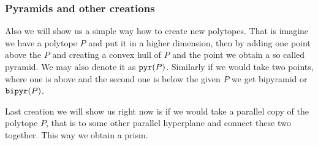 \subsubsection{Pyramids and other creations}

Also we will show us a simple way how to create new polytopes. That is imagine we have a polytope $P$ and put it in a higher dimension, then by adding one point above the $P$ and creating a convex hull of $P$ and the point we obtain a so called pyramid. We may also denote it as $\mathtt{pyr}(P)$. Similarly if we would take two points, where one is above and the second one is below the given $P$ we get bipyramid or $\mathtt{bipyr}(P)$.

Last creation we will show us right now is if we would take a parallel copy of the polytope $P$, that is to some other parallel hyperplane and connect these two together. This way we obtain a prism.

